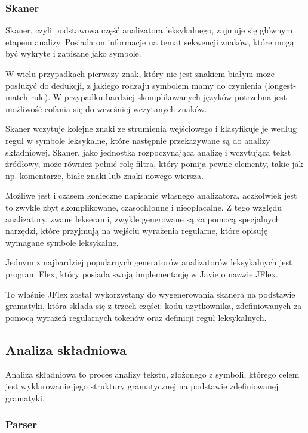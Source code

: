 \documentclass[a4paper,12pt,twoside]{article}
\begin{document}
\subsubsection{Skaner}

Skaner, czyli podstawowa część analizatora leksykalnego, zajmuje się głównym etapem analizy. Posiada on informacje na temat sekwencji znaków, które mogą być wykryte i zapisane jako symbole.

W wielu przypadkach pierwszy znak, który nie jest znakiem białym może posłużyć do dedukcji, z jakiego rodzaju symbolem mamy do czynienia (longest-match rule). W przypadku bardziej skomplikowanych języków potrzebna jest możliwość cofania się do wcześniej wczytanych znaków.

Skaner wczytuje kolejne znaki ze strumienia wejściowego i klasyfikuje je według reguł w symbole leksykalne, które następnie przekazywane są do analizy składniowej. Skaner, jako jednostka rozpoczynająca analizę i wczytująca tekst źródłowy, może również pełnić rolę filtra, który pomija pewne elementy, takie jak np. komentarze, białe znaki lub znaki nowego wiersza.

Możliwe jest i czasem konieczne napisanie własnego analizatora, aczkolwiek jest to zwykle zbyt skomplikowane, czasochłonne i nieopłacalne. Z tego względu analizatory, zwane lekserami, zwykle generowane są za pomocą specjalnych narzędzi, które przyjmują na wejściu wyrażenia regularne, które opisuję wymagane symbole leksykalne.

Jednym z najbardziej popularnych generatorów analizatorów leksykalnych jest program Flex\cite{flex}, który posiada swoją implementację w Javie o nazwie JFlex\cite{jflex}.

To właśnie JFlex został wykorzystany do wygenerowania skanera na podstawie gramatyki, która składa się z trzech części: kodu użytkownika, zdefiniowanych za pomocą wyrażeń regularnych tokenów oraz definicji reguł leksykalnych.

\subsection{Analiza składniowa}

Analiza składniowa to proces analizy tekstu, złożonego z symboli, którego celem jest wyklarowanie jego struktury gramatycznej na podstawie zdefiniowanej gramatyki.

\subsubsection{Parser}
\end{document}
